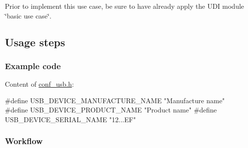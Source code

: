 Prior to implement this use case, be sure to have already apply the U\-D\-I module \char`\"{}basic use case\char`\"{}.\hypertarget{udc_use_case_2_udc_use_case_2_usage}{}\subsection{Usage steps}\label{udc_use_case_2_udc_use_case_2_usage}
\hypertarget{udc_use_case_2_udc_use_case_2_usage_code}{}\subsubsection{Example code}\label{udc_use_case_2_udc_use_case_2_usage_code}
Content of \hyperlink{conf__usb_8h}{conf\-\_\-usb.\-h}\-: 
\begin{DoxyCode}
\textcolor{preprocessor}{        #define  USB\_DEVICE\_MANUFACTURE\_NAME      "Manufacture name"}
\textcolor{preprocessor}{}\textcolor{preprocessor}{        #define  USB\_DEVICE\_PRODUCT\_NAME          "Product name"}
\textcolor{preprocessor}{        #define  USB\_DEVICE\_SERIAL\_NAME           "12...EF"}
\end{DoxyCode}
\hypertarget{udc_use_case_2_udc_use_case_2_usage_flow}{}\subsubsection{Workflow}\label{udc_use_case_2_udc_use_case_2_usage_flow}

